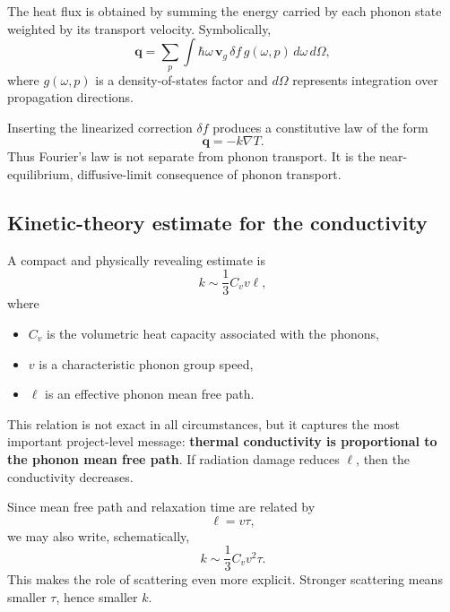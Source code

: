 \documentclass[11pt]{article}
\newcommand{\vvg}{\mathbf{v}_g}
\newcommand{\qvec}{\mathbf{q}}
\begin{document}
The heat flux is obtained by summing the energy carried by each phonon state weighted by its transport velocity. Symbolically,
\begin{equation}
 \qvec = \sum_{p}\int \hbar\omega\, \vvg\, \delta f\, g(\omega,p)\, d\omega\, d\Omega,
\end{equation}
where $g(\omega,p)$ is a density-of-states factor and $d\Omega$ represents integration over propagation directions.

Inserting the linearized correction $\delta f$ produces a constitutive law of the form
\begin{equation}
 \qvec = -k\nabla T.
\end{equation}
Thus Fourier's law is not separate from phonon transport. It is the near-equilibrium, diffusive-limit consequence of phonon transport.

\subsection{Kinetic-theory estimate for the conductivity}

A compact and physically revealing estimate is
\begin{equation}
 k \sim \frac{1}{3} C_v v \ell,
\end{equation}
where
\begin{itemize}
    \item $C_v$ is the volumetric heat capacity associated with the phonons,
    \item $v$ is a characteristic phonon group speed,
    \item $\ell$ is an effective phonon mean free path.
\end{itemize}

This relation is not exact in all circumstances, but it captures the most important project-level message: \textbf{thermal conductivity is proportional to the phonon mean free path}. If radiation damage reduces $\ell$, then the conductivity decreases.

Since mean free path and relaxation time are related by
\begin{equation}
\ell = v\tau,
\end{equation}
we may also write, schematically,
\begin{equation}
 k \sim \frac{1}{3} C_v v^2 \tau.
\end{equation}
This makes the role of scattering even more explicit. Stronger scattering means smaller $\tau$, hence smaller $k$.
\end{document}
